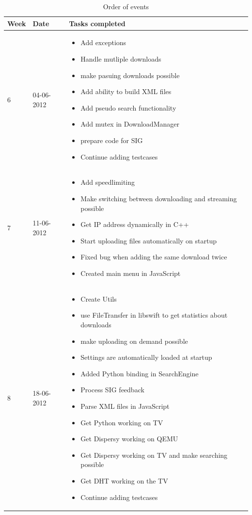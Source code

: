 \begin{table}
\centering
	\begin{tabular}{| l | l | p{8 cm} |}
		\hline
		Week & Date & Tasks completed \\
		\hline
		\hline
		6 & 04-06-2012 &		\begin{itemize}
								\item Add exceptions
								\item Handle mutliple downloads
								\item make pasuing downloads possible
								\item Add ability to build XML files
								\item Add pseudo search functionality
								\item Add mutex in DownloadManager
								\item prepare code for SIG
								\item Continue adding testcases
							\end{itemize} \\
		\hline
		7 & 11-06-2012 &		\begin{itemize}
								\item Add speedlimiting
								\item Make switching between downloading and streaming possible
								\item Get IP address dynamically in C++
								\item Start uploading files automatically on startup
								\item Fixed bug when adding the same download twice
								\item Created main menu in JavaScript
							\end{itemize} \\
		\hline
		8 & 18-06-2012 &		\begin{itemize}
								\item Create Utils
								\item use FileTransfer in libswift to get statistics about downloads
								\item make uploading on demand possible
								\item Settings are automatically loaded at startup
								\item Added Python binding in SearchEngine
								\item Process SIG feedback
								\item Parse XML files in JavaScript
								\item Get Python working on TV
								\item Get Dispersy working on QEMU
								\item Get Dispersy working on TV and make searching possible
								\item Get DHT working on the TV
								\item Continue adding testcases
							\end{itemize} \\
		\hline
\end{tabular}
\caption{Order of events}
\label{tab:planning}
\end{table}

